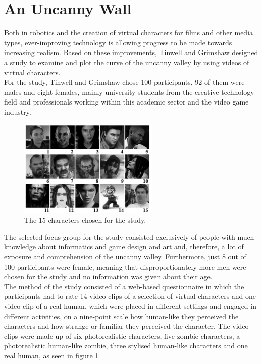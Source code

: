 \section{An Uncanny Wall}
Both in robotics and the creation of virtual characters for films and other media types, ever-improving technology is allowing progress to be made towards increasing realism. Based on these improvements, Tinwell and Grimshaw \cite{uncanny_wall} designed a study to examine and plot the curve of the uncanny valley by using videos of virtual characters.\\
For the study, Tinwell and Grimshaw chose 100 participants, 92 of them were males and eight females, mainly university students from the creative technology field and professionals working within this academic sector and the video game industry. \begin{figure} %
    \centering
    \includegraphics[width=0.6\textwidth]{graphics/uncanny_wall.png}
    \caption{The 15 characters chosen for the study.}
    \label{fig:uncannyWall}
\end{figure}
The selected focus group for the study consisted exclusively of people with much knowledge about informatics and game design and art and, therefore, a lot of exposure and comprehension of the uncanny valley.
Furthermore, just 8 out of 100 participants were female, meaning that disproportionately more men were chosen for the study and no information was given about their age.\\
The method of the study consisted of a web-based questionnaire in which the participants had to rate 14 video clips of a selection of virtual characters and one video clip of a real human, which were placed in different settings and engaged in different activities, on a nine-point scale how human-like they perceived the characters and how strange or familiar they perceived the character. The video clips were made up of six photorealistic characters, five zombie characters, a photorealistic human-like zombie, three stylised human-like characters and one real human, as seen in figure \ref{fig:uncannyWall}\\
